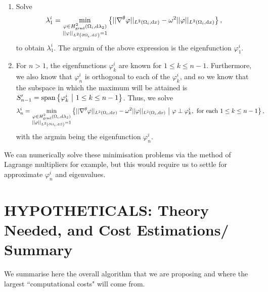 \begin{enumerate}
	\item Solve
	\begin{align*}
		\lambda_1^i &= \min_{\substack{\varphi\in H^2_\mathrm{grad}\left( \Omega_i, \mathrm{d}\lambda_2 \right) \\ \lvert\lvert \varphi \rvert\rvert_{L^{2}\left( \partial\Omega_i,\mathrm{d}S \right)}=1}} \left\{  \lvert\lvert \nabla^{\theta} \varphi \rvert\rvert_{L^{2}\left( \Omega_i,\mathrm{d}x \right)} - \omega^2 \lvert\lvert \varphi \rvert\rvert_{L^{2}\left( \Omega_i,\mathrm{d}x \right)}  \right\},
	\end{align*}
	to obtain $\lambda_1^i$.
	The argmin of the above expression is the eigenfunction $\varphi_1^i$.
	\item For $n>1$, the eigenfunctions $\varphi_k^i$ are known for $1\leq k\leq n-1$.
	Furthermore, we also know that $\varphi_n^i$ is orthogonal to each of the $\varphi_k^i$, and so we know that the subspace in which the maximum will be attained is $S'_{n-1} = \mathrm{span}\left\{ \varphi_k^i \ \middle\vert \  1\leq k\leq n-1 \right\}$.
	Thus, we solve
	\begin{align*}
		\lambda_n^i &= \min_{\substack{\varphi\in H^2_\mathrm{grad}\left( \Omega_i, \mathrm{d}\lambda_2 \right) \\ \lvert\lvert \varphi \rvert\rvert_{L^{2}\left( \partial\Omega_i,\mathrm{d}S \right)}=1}} \left\{  \lvert\lvert \nabla^{\theta} \varphi \rvert\rvert_{L^{2}\left( \Omega_i,\mathrm{d}x \right)} - \omega^2 \lvert\lvert \varphi \rvert\rvert_{L^{2}\left( \Omega_i,\mathrm{d}x \right)} \ \middle\vert \  \varphi\perp\varphi_k^i, \text{ for each } 1\leq k\leq n-1  \right\},
	\end{align*}
	with the argmin being the eigenfunction $\varphi_n^i$.
\end{enumerate}
We can numerically solve these minimisation problems via the method of Lagrange multipliers for example, but this would require us to settle for approximate $\varphi_n^i$ and eigenvalues.

\section*{HYPOTHETICALS: Theory Needed, and Cost Estimations/ Summary}
We summarise here the overall algorithm that we are proposing and where the largest ``computational costs" will come from.

